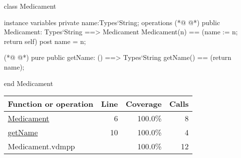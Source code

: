 \begin{vdmpp}[breaklines=true]
class Medicament

instance variables
  private name:Types`String;
operations
(*@
\label{Medicament:6}
@*)
 public Medicament: Types`String ==> Medicament
  Medicament(n) == (name := n; return self)
 post name = n;
 
(*@
\label{getName:10}
@*)
 pure public getName: () ==> Types`String
  getName() == (return name);

end Medicament
\end{vdmpp}
\bigskip
\begin{longtable}{|l|r|r|r|}
\hline
Function or operation & Line & Coverage & Calls \\
\hline
\hline
\hyperref[Medicament:6]{Medicament} & 6&100.0\% & 8 \\
\hline
\hyperref[getName:10]{getName} & 10&100.0\% & 4 \\
\hline
\hline
Medicament.vdmpp & & 100.0\% & 12 \\
\hline
\end{longtable}

